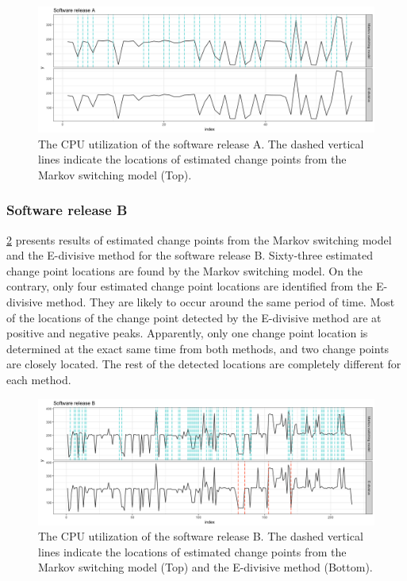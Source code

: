 \begin{figure}[H]
\begin{centering}
\includegraphics[scale=0.35]{picture/compare_L16A}
\par\end{centering}
\caption{The CPU utilization of the software release A. The dashed vertical
lines indicate the locations of estimated change points from the Markov
switching model (Top). }

\label{compare_L16A}
\end{figure}


\subsubsection{Software release B}

\ref{compare_L16B} presents results of estimated change points from
the Markov switching model and the E-divisive method for the software
release B. Sixty-three estimated change point locations are found
by the Markov switching model. On the contrary, only four estimated
change point locations are identified from the E-divisive method.
They are likely to occur around the same period of time. Most of the
locations of the change point detected by the E-divisive method are
at positive and negative peaks. Apparently, only one change point
location is determined at the exact same time from both methods, and
two change points are closely located. The rest of the detected locations
are completely different for each method.

\begin{figure}[H]
\begin{centering}
\includegraphics[scale=0.35]{picture/compare_L16B}
\par\end{centering}
\caption{The CPU utilization of the software release B. The dashed vertical
lines indicate the locations of estimated change points from the Markov
switching model (Top) and the E-divisive method (Bottom). }

\label{compare_L16B}
\end{figure}


